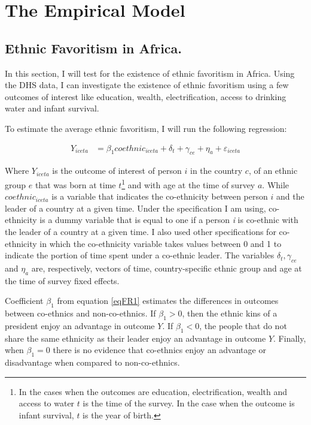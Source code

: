 \documentclass{wptemp}
\begin{document}
\section{The Empirical Model}\label{sec4}
\subsection{Ethnic Favoritism in Africa.}
In this section, I will test for the existence of ethnic favoritism in Africa. Using the DHS data, I can investigate the existence of ethnic favoritism using a few outcomes of interest like education, wealth, electrification, access to drinking water and infant survival.

To estimate the average ethnic favoritism, I will run the following regression:

\begin{equation}\label{eqFR1}
\begin{split}
    Y_{iceta} &= \beta_{1}coethnic_{iceta}
    + \delta_{t} + \gamma_{ce} +\eta_{a}  + \varepsilon_{iceta}
\end{split}
\end{equation}

Where $Y_{iceta}$ is the outcome of interest of person $i$ in the country  $c$, of an ethnic group $e$ that was born at time $t$\footnote{In the cases when the outcomes are education, electrification, wealth and access to water $t$ is the time of the survey. In the case when the outcome is infant survival, $t$ is the year of birth.} and with age at the time of survey $a$. While $coethnic_{iceta}$ is a variable that indicates the co-ethnicity between person $i$ and the leader of a country at a given time. Under the specification I am using, co-ethnicity is a dummy variable that is equal to one if a person \textit{i} is co-ethnic with the leader of a country at a given time. I also used other specifications for co-ethnicity in which the co-ethnicity variable takes values between 0 and 1 to indicate the portion of time spent under a co-ethnic leader. The variables $\delta_{t}, \gamma_{ce}$ and $\eta_{a}$  are, respectively, vectors of time, country-specific ethnic group and age at the time of survey fixed effects.

Coefficient $\beta_{1}$ from equation \ref{eqFR1} estimates the differences in outcomes between co-ethnics and non-co-ethnics. If $\beta_{1} > 0$, then the ethnic kins of a president enjoy an advantage in outcome $Y$. If $\beta_{1} < 0$, the people that do not share the same ethnicity as their leader enjoy an advantage in outcome $Y$. Finally, when $\beta_{1} = 0$ there is no evidence that co-ethnics enjoy an advantage or disadvantage when compared to non-co-ethnics. 
\end{document}

